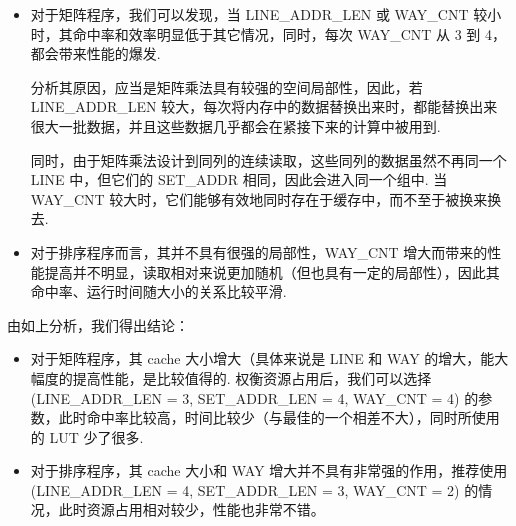 \documentclass{article}
\begin{document}
\begin{itemize}
  \item
    对于矩阵程序，我们可以发现，当 LINE\_ADDR\_LEN 或 WAY\_CNT 较小时，其命中率和效率明显低于其它情况，同时，每次 WAY\_CNT 从 3 到 4，都会带来性能的爆发.

    分析其原因，应当是矩阵乘法具有较强的空间局部性，因此，若 LINE\_ADDR\_LEN 较大，每次将内存中的数据替换出来时，都能替换出来很大一批数据，并且这些数据几乎都会在紧接下来的计算中被用到.

    同时，由于矩阵乘法设计到同列的连续读取，这些同列的数据虽然不再同一个 LINE 中，但它们的 SET\_ADDR 相同，因此会进入同一个组中. 当 WAY\_CNT 较大时，它们能够有效地同时存在于缓存中，而不至于被换来换去.
  \item
    对于排序程序而言，其并不具有很强的局部性，WAY\_CNT 增大而带来的性能提高并不明显，读取相对来说更加随机（但也具有一定的局部性），因此其命中率、运行时间随大小的关系比较平滑.
\end{itemize}

由如上分析，我们得出结论：

\begin{itemize}
  \item
    对于矩阵程序，其 cache 大小增大（具体来说是 LINE 和 WAY 的增大，能大幅度的提高性能，是比较值得的. 权衡资源占用后，我们可以选择 (LINE\_ADDR\_LEN = 3, SET\_ADDR\_LEN = 4, WAY\_CNT = 4) 的参数，此时命中率比较高，时间比较少（与最佳的一个相差不大），同时所使用的 LUT 少了很多.
  \item
    对于排序程序，其 cache 大小和 WAY 增大并不具有非常强的作用，推荐使用 (LINE\_ADDR\_LEN = 4, SET\_ADDR\_LEN = 3, WAY\_CNT = 2) 的情况，此时资源占用相对较少，性能也非常不错。
\end{itemize}
\end{document}
